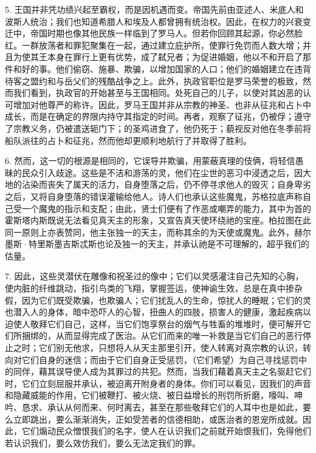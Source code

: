 5. 王国并非凭功绩兴起至霸权，而是因机遇而变。帝国先前由亚述人、米底人和波斯人统治；我们也知道希腊人和埃及人都曾拥有统治权。因此，在权力的兴衰变迁中，帝国时期也像其他民族一样临到了罗马人。但若你回顾其起源，你必然脸红。一群放荡者和罪犯聚集在一起，通过建立庇护所，使罪行免罚而人数大增；并且为使其王本身在罪行上更有优势，成了弑兄者；为促进婚姻，他以不和开启了那件和好的事。他们偷窃、施暴、欺骗，以增加国家的人口；他们的婚姻建立在违背待客之盟约和与岳父们的残酷战争之上。此外，执政官职位是罗马荣誉的极致，然而我们看到，执政官的开始甚至与王国相同。处死自己的儿子，以使对其凶恶的认可增加对他尊严的称许。因此，罗马王国并非从宗教的神圣、也非从征兆和占卜中成长，而是在确定的界限内持守其指定的时间。再者，观察了征兆，仍被俘；遵守了宗教义务，仍被遣送轭门下；的圣鸡进食了，他仍死于；藐视反对他在冬季前将船队派往的占卜和征兆，然而他却更顺利地航行了并取得了胜利。\par

6. 然而，这一切的根源是相同的，它误导并欺骗，用蒙蔽真理的伎俩，将轻信愚昧的民众引入歧途。这些是不洁和游荡的灵，他们在尘世的恶习中浸透之后，因大地的沾染而丧失了属天的活力，自身堕落之后，仍不停寻求他人的毁灭；自身卑劣之后，又将自身堕落的错误灌输给他人。诗人们也承认这些魔鬼，苏格拉底声称自己受一个魔鬼的指示和支配；由此，贤士们便有了作恶或嘲弄的能力，其中为首的霍斯塔内斯既说无法看见真天主的形象，又宣告真天使环绕祂的宝座。柏拉图在此同一原则上亦表赞同，他主张独一的天主，而称其余的为天使或魔鬼。此外，赫尔墨斯·特里斯墨吉斯忒斯也论及独一的天主，并承认祂是不可理解的，超乎我们的估量。\par

7. 因此，这些灵潜伏在雕像和祝圣过的像中；它们以灵感灌注自己先知的心胸，使内脏的纤维跳动，指引鸟类的飞翔，掌握签运，使神谕生效，总是在真中掺杂假，因为它们既受欺骗，也欺骗人；它们扰乱人的生命，惊扰人的睡眠；它们的灵也潜入人的身体，暗中恐吓人的心智，扭曲人的四肢，损害人的健康，激起疾病以迫使人敬拜它们自己，这样，当它们饱享祭台的烟气与牲畜的堆堆时，便可解开它们所捆绑的，从而显得完成了医治。从它们而来的唯一补救是当它们自己的恶行停止之时；它们别无他求，只想将人从天主那里引开，使人转离对真宗教的认识，转向对它们自身的迷信；而由于它们自身正受惩罚，（它们希望）为自己寻找惩罚中的同伴，藉其误导使人成为其罪过的共犯。然而，当我们藉着真天主之名驱赶它们时，它们立刻屈服并承认，被迫离开附身者的身体。你们可以看见，因我们的声音和隐藏威能的作用，它们被鞭打、被火烧、被日益增长的刑罚所折磨，嚎叫、呻吟、恳求、承认从何而来、何时离去，甚至在那些敬拜它们的人耳中也是如此，要么立即跳出，要么渐渐消失，正如受苦者的信德相助，或医治者的恩宠所成就。因此，它们煽动民众憎恨我们的名字，使人在认识我们之前就开始恨我们，免得他们若认识我们，要么效仿我们，要么无法定我们的罪。\par

